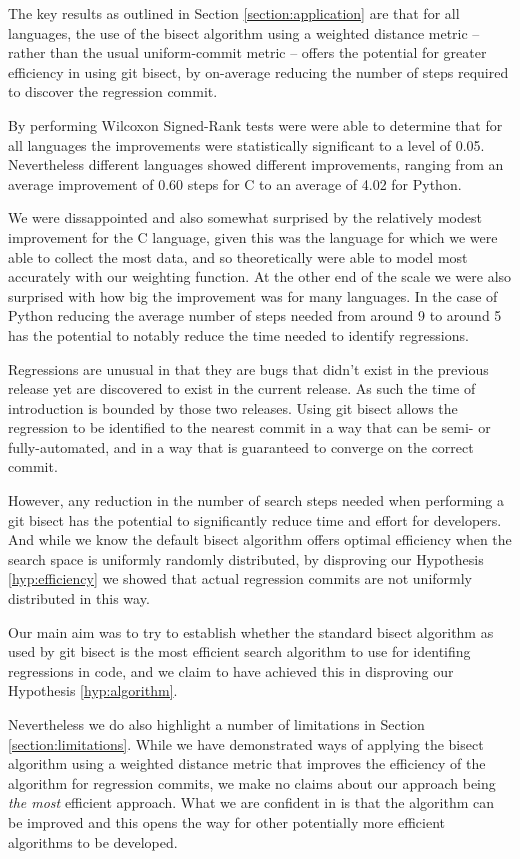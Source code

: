 \documentclass[10pt,journal,compsoc]{IEEEtran}
\begin{document}
The key results as outlined in Section \ref{section:application} are that for all languages, the use of the bisect algorithm using a weighted distance metric -- rather than the usual uniform-commit metric -- offers the potential for greater efficiency in using {\code git bisect}, by on-average reducing the number of steps required to discover the regression commit.

By performing Wilcoxon Signed-Rank tests were were able to determine that for all languages the improvements were statistically significant to a level of 0.05. Nevertheless different languages showed different improvements, ranging from an average improvement of 0.60 steps for C to an average of 4.02 for Python.

We were dissappointed and also somewhat surprised by the relatively modest improvement for the C language, given this was the language for which we were able to collect the most data, and so theoretically were able to model most accurately with our weighting function. At the other end of the scale we were also surprised with how big the improvement was for many languages. In the case of Python reducing the average number of steps needed from around 9 to around 5 has the potential to notably reduce the time needed to identify regressions.

Regressions are unusual in that they are bugs that didn't exist in the previous release yet are discovered to exist in the current release. As such the time of introduction is bounded by those two releases. Using {\code git bisect} allows the regression to be identified to the nearest commit in a way that can be semi- or fully-automated, and in a way that is guaranteed to converge on the correct commit.

However, any reduction in the number of search steps needed when performing a {\code git bisect} has the potential to significantly reduce time and effort for developers. And while we know the default bisect algorithm offers optimal efficiency when the search space is uniformly randomly distributed, by disproving our Hypothesis \ref{hyp:efficiency} we showed that actual regression commits are not uniformly distributed in this way.

Our main aim was to try to establish whether the standard bisect algorithm as used by {\code git bisect} is the most efficient search algorithm to use for identifing regressions in code, and we claim to have achieved this in disproving our Hypothesis \ref{hyp:algorithm}.

Nevertheless we do also highlight a number of limitations in Section \ref{section:limitations}. While we have demonstrated ways of applying the bisect algorithm using a weighted distance metric that improves the efficiency of the algorithm for regression commits, we make no claims about our approach being {\it the most\/} efficient approach. What we are confident in is that the algorithm can be improved and this opens the way for other potentially more efficient algorithms to be developed.
\end{document}
